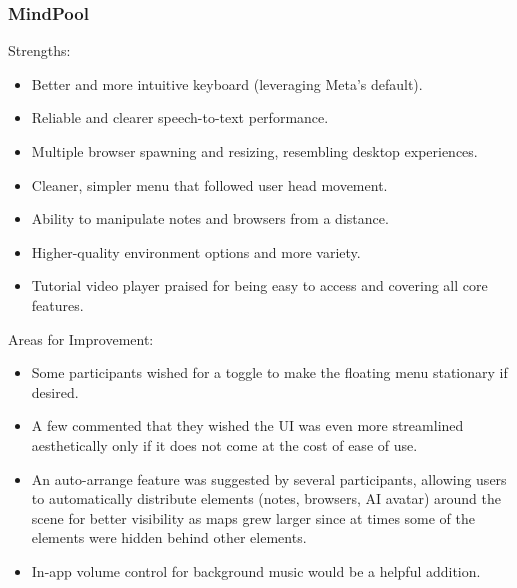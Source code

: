 \documentclass{CPP}
\begin{document}
\subsubsection{MindPool}
Strengths:
\begin{itemize}
    \item Better and more intuitive keyboard (leveraging Meta’s default).
    \item Reliable and clearer speech-to-text performance.
    \item Multiple browser spawning and resizing, resembling desktop experiences.
    \item Cleaner, simpler menu that followed user head movement.
    \item Ability to manipulate notes and browsers from a distance.
    \item Higher-quality environment options and more variety.
    \item Tutorial video player praised for being easy to access and covering all core features.
\end{itemize}
Areas for Improvement:
\begin{itemize}
    \item Some participants wished for a toggle to make the floating menu stationary if desired.
    \item A few commented that they wished the UI was even more streamlined aesthetically only if it does not come at the cost of ease of use.
    \item An auto-arrange feature was suggested by several participants, allowing users to automatically distribute elements (notes, browsers, AI avatar) around the scene for better visibility as maps grew larger since at times some of the elements were hidden behind other elements.
    \item In-app volume control for background music would be a helpful addition.
\end{itemize}
\end{document}
